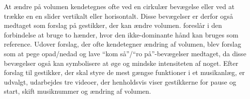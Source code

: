 \noindent
%
At ændre på volumen kendetegnes ofte ved en cirkulær bevægelse eller ved at trække en en slider vertikalt eller horisontalt. Disse bevægelser er derfor også medtaget som forslag på gestikker, der kan ændre volumen. \textcite[s. 48]{PDF:UserDefinedGesturesTV} foreslår i den forbindelse at bruge to hænder, hvor den ikke-dominante hånd kan bruges som reference. Udover forslag, der ofte kendetegner ændring af volumen, blev forslag som at pege opad/nedad og lave \enquote{kom så}/\enquote{ro på}-bevægelser medtaget, da disse bevægelser også kan symbolisere at øge og mindske intensiteten af noget. \blankline
%
Efter forslag til gestikker, der skal styre de mest gængse funktioner i et musikanlæg, er udvalgt, udarbejdes tre videoer, der henholdsvis viser gestikkerne for pause og start, skift musiknummer og ændring af volumen. 

